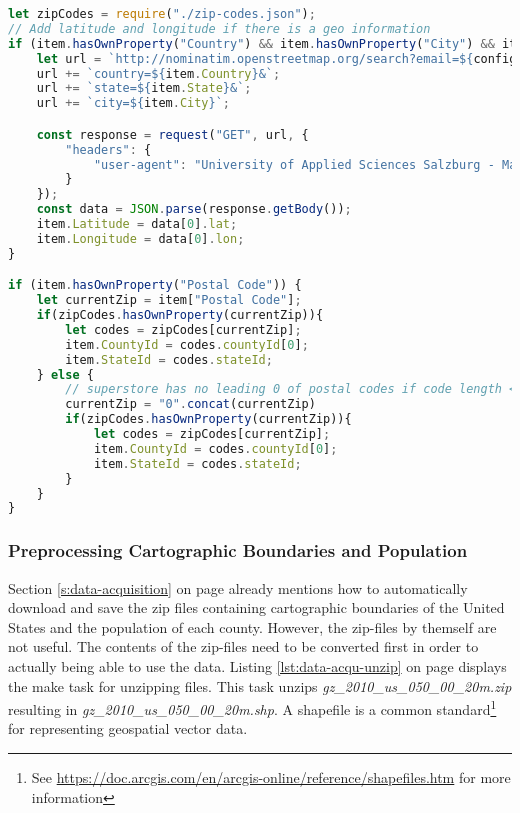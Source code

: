 \begin{lstlisting}[language=JavaScript, caption={Preprocessing Superstore-Sale with latitude and longitude}, label={lst:data-prep-latlong}]
let zipCodes = require("./zip-codes.json");
// Add latitude and longitude if there is a geo information
if (item.hasOwnProperty("Country") && item.hasOwnProperty("City") && item.hasOwnProperty("State")) {
    let url = `http://nominatim.openstreetmap.org/search?email=${config.email}&format=json&`;
    url += `country=${item.Country}&`;
    url += `state=${item.State}&`;
    url += `city=${item.City}`;

    const response = request("GET", url, {
        "headers": {
            "user-agent": "University of Applied Sciences Salzburg - Masterthesis Particles - MMT-M2014"
        }
    });
    const data = JSON.parse(response.getBody());
    item.Latitude = data[0].lat;
    item.Longitude = data[0].lon;
}

if (item.hasOwnProperty("Postal Code")) {
    let currentZip = item["Postal Code"];
    if(zipCodes.hasOwnProperty(currentZip)){
        let codes = zipCodes[currentZip];
        item.CountyId = codes.countyId[0];
        item.StateId = codes.stateId;
    } else {
        // superstore has no leading 0 of postal codes if code length < 5;
        currentZip = "0".concat(currentZip)
        if(zipCodes.hasOwnProperty(currentZip)){
            let codes = zipCodes[currentZip];
            item.CountyId = codes.countyId[0];
            item.StateId = codes.stateId;
        }
    }
}
\end{lstlisting}

\subsubsection{Preprocessing Cartographic Boundaries and Population}
Section \ref{s:data-acquisition} on page \pageref{s:data-acquisition} already mentions how to automatically download and save the zip files containing cartographic boundaries of the United States and the population of each county. However, the zip-files by themself are not useful. The contents of the zip-files need to be converted first in order to actually being able to use the data. Listing \ref{lst:data-acqu-unzip} on page \pageref{lst:data-acqu-unzip} displays the make task for unzipping files. This task unzips \textit{gz\_2010\_us\_050\_00\_20m.zip} resulting in \textit{gz\_2010\_us\_050\_00\_20m.shp}. A shapefile is a common standard\footnote{See \href{https://doc.arcgis.com/en/arcgis-online/reference/shapefiles.htm}{https://doc.arcgis.com/en/arcgis-online/reference/shapefiles.htm} for more information} for representing geospatial vector data.

